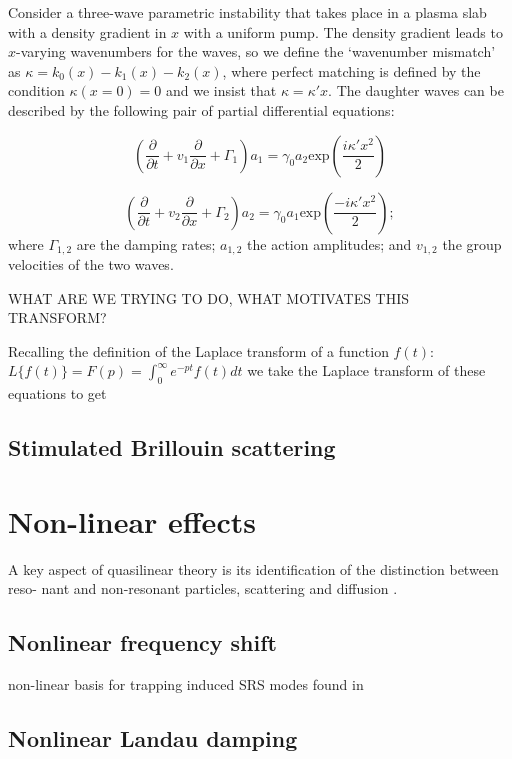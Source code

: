 Consider a three-wave parametric instability that takes place in a plasma slab with a density gradient in $x$ with a uniform pump. The density gradient leads to $x$-varying wavenumbers for the waves, so we define the `wavenumber mismatch' as $\kappa = k_0(x) - k_1(x) - k_2(x)$, where perfect matching is defined by the condition $\kappa(x=0) = 0$ and we insist that $\kappa = \kappa' x$. The daughter waves can be described by the following pair of partial differential equations:

\begin{equation}
 \left(\frac{\partial}{\partial t} + v_1\frac{\partial}{\partial x} + \Gamma_1 \right)a_1 = \gamma_0a_2\text{exp}\left(\frac{i\kappa'x^2}{2}\right)
\end{equation}

\begin{equation}
 \left(\frac{\partial}{\partial t} + v_2\frac{\partial}{\partial x} + \Gamma_2 \right)a_2 = \gamma_0a_1\text{exp}\left(\frac{-i\kappa'x^2}{2}\right);
\end{equation} 
where $\Gamma_{1,2}$ are the damping rates; $a_{1,2}$ the action amplitudes; and $v_{1,2}$ the group velocities of the two waves. 

WHAT ARE WE TRYING TO DO, WHAT MOTIVATES THIS TRANSFORM?

Recalling the definition of the Laplace transform of a function $f(t)$: $L\{f(t)\}= F(p) = \int_0^\infty e^{-pt} f(t) dt$ we take the Laplace transform of these equations to get






\subsection{Stimulated Brillouin scattering}


\section{Non-linear effects}
A key aspect of quasilinear theory is its identification of the distinction between reso-
nant and non-resonant particles, scattering and diffusion \citep{Sagdeev2018}.

\subsection{Nonlinear frequency shift}
non-linear basis for trapping induced SRS modes found in \cite{Rose2001}
\subsection{Nonlinear Landau damping}





